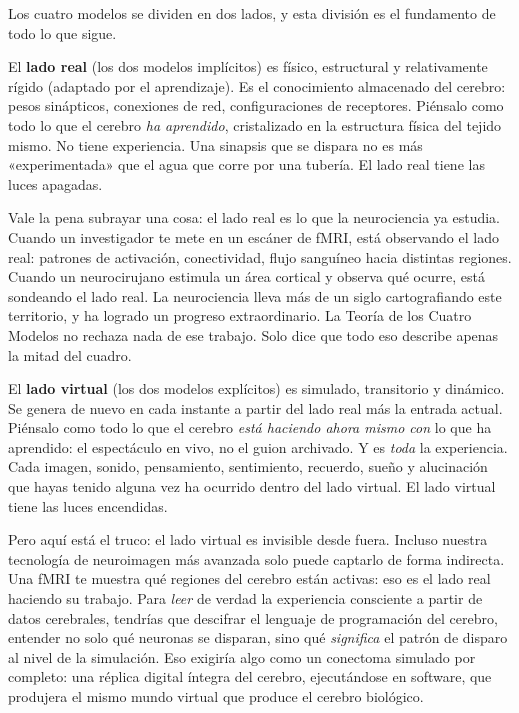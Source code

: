 \documentclass[11pt, twoside, openright]{book}
\begin{document}
Los cuatro modelos se dividen en dos lados, y esta división es el fundamento de todo lo que sigue.

El \textbf{lado real} (los dos modelos implícitos) es físico, estructural y relativamente rígido (adaptado por el aprendizaje). Es el conocimiento almacenado del cerebro: pesos sinápticos, conexiones de red, configuraciones de receptores. Piénsalo como todo lo que el cerebro \textit{ha aprendido}, cristalizado en la estructura física del tejido mismo. No tiene experiencia. Una sinapsis que se dispara no es más «experimentada» que el agua que corre por una tubería. El lado real tiene las luces apagadas.

Vale la pena subrayar una cosa: el lado real es lo que la neurociencia ya estudia. Cuando un investigador te mete en un escáner de fMRI, está observando el lado real: patrones de activación, conectividad, flujo sanguíneo hacia distintas regiones. Cuando un neurocirujano estimula un área cortical y observa qué ocurre, está sondeando el lado real. La neurociencia lleva más de un siglo cartografiando este territorio, y ha logrado un progreso extraordinario. La Teoría de los Cuatro Modelos no rechaza nada de ese trabajo. Solo dice que todo eso describe apenas la mitad del cuadro.

El \textbf{lado virtual} (los dos modelos explícitos) es simulado, transitorio y dinámico. Se genera de nuevo en cada instante a partir del lado real más la entrada actual. Piénsalo como todo lo que el cerebro \textit{está haciendo ahora mismo con} lo que ha aprendido: el espectáculo en vivo, no el guion archivado. Y es \textit{toda} la experiencia. Cada imagen, sonido, pensamiento, sentimiento, recuerdo, sueño y alucinación que hayas tenido alguna vez ha ocurrido dentro del lado virtual. El lado virtual tiene las luces encendidas.

Pero aquí está el truco: el lado virtual es invisible desde fuera. Incluso nuestra tecnología de neuroimagen más avanzada solo puede captarlo de forma indirecta. Una fMRI te muestra qué regiones del cerebro están activas: eso es el lado real haciendo su trabajo. Para \textit{leer} de verdad la experiencia consciente a partir de datos cerebrales, tendrías que descifrar el lenguaje de programación del cerebro, entender no solo qué neuronas se disparan, sino qué \textit{significa} el patrón de disparo al nivel de la simulación. Eso exigiría algo como un conectoma simulado por completo: una réplica digital íntegra del cerebro, ejecutándose en software, que produjera el mismo mundo virtual que produce el cerebro biológico.
\end{document}
